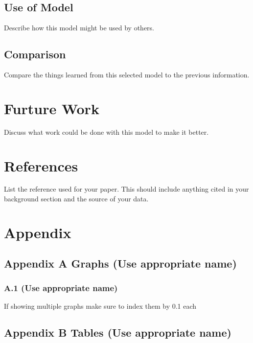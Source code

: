 \documentclass[
  12pt]{article}
\begin{document}
\subsection{Use of Model}\label{use-of-model}

Describe how this model might be used by others.

\subsection{Comparison}\label{comparison}

Compare the things learned from this selected model to the previous
information.

\newpage

\section{Furture Work}\label{furture-work}

Discuss what work could be done with this model to make it better.

\newpage

\section{References}\label{references}

List the reference used for your paper. This should include anything
cited in your background section and the source of your data.

\newpage

\section{Appendix}\label{appendix}

\subsection{Appendix A Graphs (Use appropriate
name)}\label{appendix-a-graphs-use-appropriate-name}

\subsubsection{A.1 (Use appropriate
name)}\label{a.1-use-appropriate-name}

If showing multiple graphs make sure to index them by 0.1 each

\newpage

\subsection{Appendix B Tables (Use appropriate
name)}\label{appendix-b-tables-use-appropriate-name}
\end{document}
